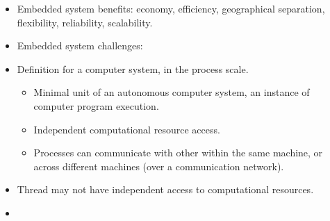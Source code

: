 \documentclass[twocolumn]{article}
\begin{document}
\begin{itemize}
\item Embedded system benefits: economy, efficiency, geographical
  separation, flexibility, reliability, scalability.
\item Embedded system challenges: 
\item Definition for a computer system, in the process scale.
  \begin{itemize}
  \item Minimal unit of an autonomous computer system, an instance of
    computer program execution.
  \item Independent computational resource access.
  \item Processes can communicate with other within the same machine,
    or across different machines (over a communication network). 
  \end{itemize}
\item Thread may not have independent access to computational
  resources. 
\item 
\end{itemize}
\end{document}
